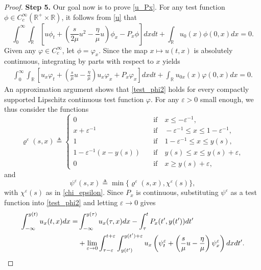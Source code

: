 \documentclass[10pt]{article}
\numberwithin{equation}{section}
\begin{document}
\begin{proof}
		\textbf{Step 5.} Our goal now is to prove \eqref{u_Px}. For any test function $\phi\in C_c^\infty(\mathbb{R}^+\times\mathbb{R})$, it follows from \eqref{u} that 
		$$\int_0^\infty\int_\mathbb{R}\left[u\phi_t+\left(\frac{s}{2\mu}u^2-\frac{\eta}{\mu}u\right)\phi_x-P_x\phi\right]dxdt+\int_\mathbb{R} u_0(x)\phi(0,x)dx=0.$$
		Given any $\varphi\in C_c^\infty$, let $\phi=\varphi_x$. Since the map $x\mapsto u(t,x)$ is absolutely continuous, integrating by parts with respect to $x$ yields
		\begin{align}
			\int_0^\infty\int_\mathbb{R}\left[u_x\varphi_t+\left(\frac{s}{\mu}u-\frac{\eta}{\mu}\right)u_x\varphi_x+P_x\varphi_x\right]dxdt+\int_\mathbb{R} u_{0x}(x)\varphi(0,x)dx=0.\label{test_phi2}
		\end{align}
		An approximation argument shows that \eqref{test_phi2} holds for every compactly supported Lipschitz continuous test function $\varphi$. For any $\varepsilon>0$ small enough, we thus consider the functions
		\begin{equation*}
			\varrho^\varepsilon(s,x)\triangleq\left\{
			\begin{array}{cll}
				0 & \quad\mathrm{if}\quad x\leq-\varepsilon^{-1}, \\
				x+\varepsilon^{-1} & \quad\mathrm{if}\quad-\varepsilon^{-1}\leq x\leq1-\varepsilon^{-1}, \\
				1 & \quad\mathrm{if}\quad1-\varepsilon^{-1}\leq x\leq y(s), \\
				1-\varepsilon^{-1}(x-y(s)) & \quad\mathrm{if}\quad y(s)\leq x\leq y(s)+\varepsilon, \\
				0 & \quad\mathrm{if}\quad x\geq y(s)+\varepsilon,
			\end{array}\right.
		\end{equation*}
		and 
		$$\psi^\varepsilon(s,x)\triangleq\min\{\varrho^\varepsilon(s,x),\chi^\varepsilon(s)\},$$
		with $\chi^\varepsilon(s)$ as in \eqref{chi_epsilon}. Since $P_x$ is continuous, substituting $\psi^\varepsilon$ as a test function into \eqref{test_phi2} and letting $\varepsilon\to0$ gives
		\begin{align}
			\int_{-\infty}^{y(t)}u_{x}(t,x)dx=&\int_{-\infty}^{y(\tau)}u_{x}(\tau,x)dx-\int_{\tau}^{t}P_{x}(t^\prime,y(t^\prime))dt^\prime\notag \\
			&+\lim_{\varepsilon\to0}\int_{\tau-\varepsilon}^{t+\varepsilon}\int_{y(t^\prime)}^{y(t^\prime)+\varepsilon}u_{x}\left(\psi_{t}^{\varepsilon}+\left(\frac{s}{\mu}u-\frac{\eta}{\mu}\right)\psi_{x}^{\varepsilon}\right)dxdt^\prime.\label{aaa}
		\end{align}

\end{proof}
\end{document}
